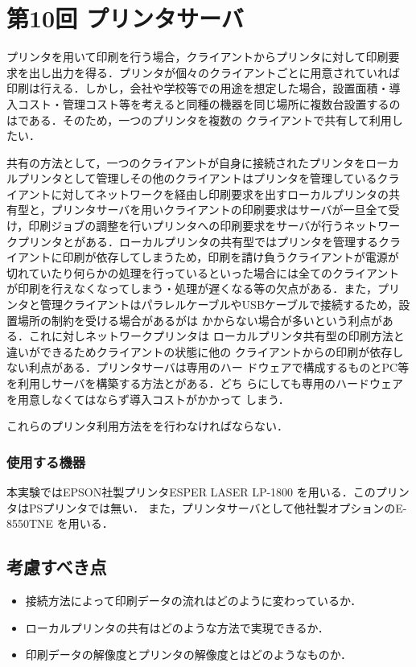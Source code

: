 \section{第10回 プリンタサーバ }
プリンタを用いて印刷を行う場合，クライアントからプリンタに対して印刷要
求を出し出力を得る．プリンタが個々のクライアントごとに用意されていれば
印刷は行える．しかし，会社や学校等での用途を想定した場合，設置面積・導
入コスト・管理コスト等を考えると同種の機器を同じ場所に複数台設置するの
は\textbf{}である．そのため，一つのプリンタを複数の
クライアントで共有して利用したい．

共有の方法として，一つのクライアントが自身に接続されたプリンタをローカ
ルプリンタとして管理しその他のクライアントはプリンタを管理しているクラ
イアントに対してネットワークを経由し印刷要求を出すローカルプリンタの共
有型と，プリンタサーバを用いクライアントの印刷要求はサーバが一旦全て受
け，印刷ジョブの調整を行いプリンタへの印刷要求をサーバが行うネットワー
クプリンタとがある．ローカルプリンタの共有型ではプリンタを管理するクラ
イアントに印刷が依存してしまうため，印刷を請け負うクライアントが電源が
切れていたり何らかの処理を行っているといった場合には全てのクライアント
が印刷を行えなくなってしまう・処理が遅くなる等の欠点がある．また，プリ
ンタと管理クライアントはパラレルケーブルやUSBケーブルで接続するため，設
置場所の制約を受ける場合があるが\textbf{}は
かからない場合が多いという利点がある．これに対しネットワークプリンタは
ローカルプリンタ共有型の印刷方法と違い\textbf{}ができるためクライアントの状態に他の
クライアントからの印刷が依存しない利点がある．プリンタサーバは専用のハー
ドウェアで構成するものとPC等を利用しサーバを構築する方法とがある．どち
らにしても専用のハードウェアを用意しなくてはならず導入コストがかかって
しまう．

これらのプリンタ利用方法を\textbf{}を行わなければならない．

\subsubsection*{使用する機器}
本実験ではEPSON社製プリンタESPER LASER LP-1800 を用いる．このプリンタはPSプリンタでは無い．
また，プリンタサーバとして他社製オプションのE-8550TNE を用いる．

\subsection*{考慮すべき点}
\begin{itemize}
\item 接続方法によって印刷データの流れはどのように変わっているか．
\item ローカルプリンタの共有はどのような方法で実現できるか．
\item 印刷データの解像度とプリンタの解像度とはどのようなものか．
\end{itemize}
